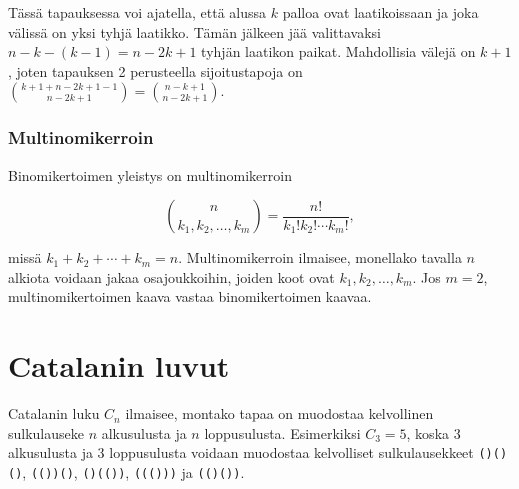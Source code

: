 \begin{center}
\end{center}

Tässä tapauksessa voi ajatella, että alussa $k$ palloa
ovat laatikoissaan ja joka välissä on yksi tyhjä laatikko.
Tämän jälkeen jää valittavaksi $n-k-(k-1)=n-2k+1$ tyhjän laatikon paikat.
Mahdollisia välejä on $k+1$, joten tapauksen 2 perusteella
sijoitustapoja on ${k+1+n-2k+1-1 \choose n-2k+1} = {n-k+1 \choose n-2k+1}$.

\subsubsection{Multinomikerroin}


Binomikertoimen yleistys on multinomikerroin

\[ {n \choose k_1,k_2,\ldots,k_m} = \frac{n!}{k_1! k_2! \cdots k_m!}, \]

missä $k_1+k_2+\cdots+k_m=n$.
Multinomikerroin ilmaisee, monellako tavalla $n$ alkiota voidaan jakaa osajoukkoihin,
joiden koot ovat $k_1,k_2,\ldots,k_m$.
Jos $m=2$, multinomikertoimen kaava vastaa binomikertoimen kaavaa.

\section{Catalanin luvut}


Catalanin luku $C_n$ ilmaisee,
montako tapaa on muodostaa kelvollinen sulkulauseke
$n$ alkusulusta ja $n$ loppusulusta.
Esimerkiksi $C_3=5$, koska 3 alkusulusta
ja 3 loppusulusta voidaan muodostaa
kelvolliset sulkulausekkeet
\texttt{()()()}, \texttt{(())()},
\texttt{()(())}, \texttt{((()))} ja \texttt{(()())}.


